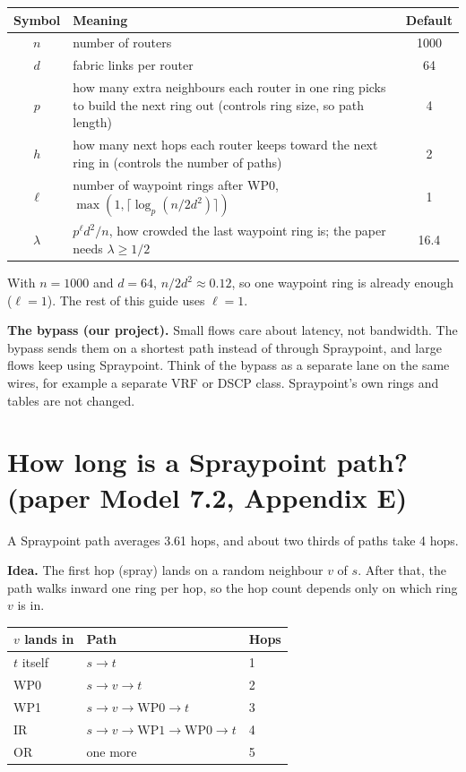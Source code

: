\documentclass[11pt]{article}
\begin{document}
\begin{center}
\begin{tabularx}{\linewidth}{@{}c L c@{}}
\toprule
Symbol & Meaning & Default \\
\midrule
$n$ & number of routers & 1000 \\
$d$ & fabric links per router & 64 \\
$p$ & how many extra neighbours each router in one ring picks to build the next ring out (controls ring size, so path length) & 4 \\
$h$ & how many next hops each router keeps toward the next ring in (controls the number of paths) & 2 \\
$\ell$ & number of waypoint rings after WP0, $\max(1, \lceil \log_p (n / 2d^2) \rceil)$ & 1 \\
$\lambda$ & $p^{\ell} d^2 / n$, how crowded the last waypoint ring is; the paper needs $\lambda \ge 1/2$ & 16.4 \\
\bottomrule
\end{tabularx}
\end{center}

With $n = 1000$ and $d = 64$, $n / 2d^2 \approx 0.12$, so one waypoint ring is already enough ($\ell = 1$). The rest of this guide uses $\ell = 1$.

\textbf{The bypass (our project).} Small flows care about latency, not bandwidth. The bypass sends them on a shortest path instead of through Spraypoint, and large flows keep using Spraypoint. Think of the bypass as a separate lane on the same wires, for example a separate VRF or DSCP class. Spraypoint's own rings and tables are not changed.

\section{How long is a Spraypoint path? (paper Model 7.2, Appendix E)}

A Spraypoint path averages 3.61 hops, and about two thirds of paths take 4 hops.

\textbf{Idea.} The first hop (spray) lands on a random neighbour $v$ of $s$. After that, the path walks inward one ring per hop, so the hop count depends only on which ring $v$ is in.

\begin{center}
\begin{tabular}{@{}lll@{}}
\toprule
$v$ lands in & Path & Hops \\
\midrule
$t$ itself & $s \to t$ & 1 \\
WP0 & $s \to v \to t$ & 2 \\
WP1 & $s \to v \to \text{WP0} \to t$ & 3 \\
IR & $s \to v \to \text{WP1} \to \text{WP0} \to t$ & 4 \\
OR & one more & 5 \\
\bottomrule
\end{tabular}
\end{center}
\end{document}
